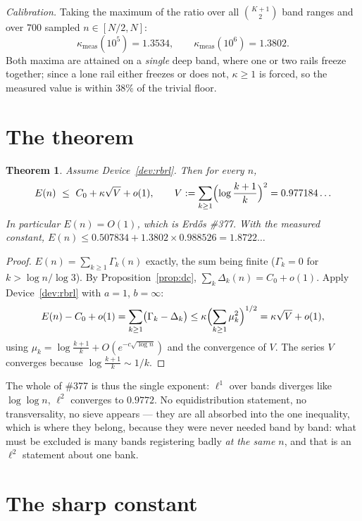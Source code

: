 \documentclass[11pt]{article}
\newtheorem{theorem}{Theorem}
\begin{document}
\emph{Calibration.}  Taking the maximum of the ratio over all $\binom{K+1}{2}$
band ranges and over $700$ sampled $n\in[N/2,N]$:
\[
  \kappa_{\mathrm{meas}}(10^5)=1.3534,\qquad \kappa_{\mathrm{meas}}(10^6)=1.3802 .
\]
Both maxima are attained on a \emph{single} deep band, where one or two rails
freeze together; since a lone rail either freezes or does not, $\kappa\ge1$ is
forced, so the measured value is within $38\%$ of the trivial floor.

\section{The theorem}

\begin{theorem}\label{thm:main}
Assume Device~\ref{dev:rbrl}.  Then for every $n$,
\[
  E(n)\ \le\ C_0+\kappa\sqrt V+o(1),
  \qquad
  V:=\sum_{k\ge1}\Bigl(\log\frac{k+1}{k}\Bigr)^2=0.977184\ldots
\]
In particular $E(n)=O(1)$, which is Erd\H{o}s \#377.  With the measured
constant, $E(n)\le0.507834+1.3802\times0.988526=1.8722\ldots$
\end{theorem}

\begin{proof}
$E(n)=\sum_{k\ge1}\Gamma_k(n)$ exactly, the sum being finite ($\Gamma_k=0$ for
$k>\log n/\log3$).  By Proposition~\ref{prop:dc},
$\sum_k\Delta_k(n)=C_0+o(1)$.  Apply Device~\ref{dev:rbrl} with $a=1$,
$b=\infty$:
\[
  E(n)-C_0+o(1)=\sum_{k\ge1}\bigl(\Gamma_k-\Delta_k\bigr)
  \le\kappa\Bigl(\sum_{k\ge1}\mu_k^2\Bigr)^{1/2}
  =\kappa\sqrt V+o(1),
\]
using $\mu_k=\log\frac{k+1}{k}+O(e^{-c\sqrt{\log n}})$ and the convergence of
$V$.  The series $V$ converges because $\log\frac{k+1}{k}\sim1/k$.
\end{proof}

The whole of \#377 is thus the single exponent: $\ell^1$ over bands diverges
like $\log\log n$, $\ell^2$ converges to $0.9772$.  No equidistribution
statement, no transversality, no sieve appears --- they are all absorbed into
the one inequality, which is where they belong, because they were never needed
band by band: what must be excluded is many bands registering badly
\emph{at the same $n$}, and that is an $\ell^2$ statement about one bank.

\section{The sharp constant}
\end{document}
